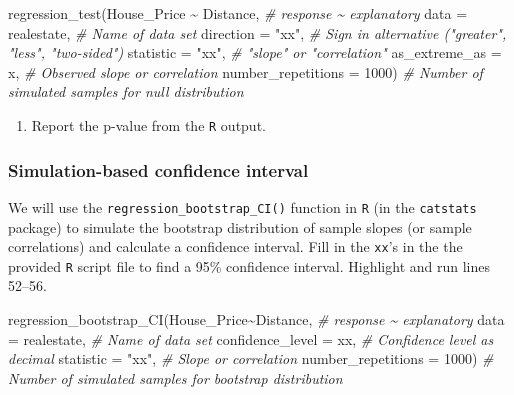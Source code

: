 \documentclass[
]{report}
\newenvironment{Shaded}{\begin{snugshade}}{\end{snugshade}}
\newcommand{\AttributeTok}[1]{\textcolor[rgb]{0.77,0.63,0.00}{#1}}
\newcommand{\CommentTok}[1]{\textcolor[rgb]{0.56,0.35,0.01}{\textit{#1}}}
\newcommand{\DecValTok}[1]{\textcolor[rgb]{0.00,0.00,0.81}{#1}}
\newcommand{\FunctionTok}[1]{\textcolor[rgb]{0.00,0.00,0.00}{#1}}
\newcommand{\NormalTok}[1]{#1}
\newcommand{\SpecialCharTok}[1]{\textcolor[rgb]{0.00,0.00,0.00}{#1}}
\newcommand{\StringTok}[1]{\textcolor[rgb]{0.31,0.60,0.02}{#1}}
\providecommand{\tightlist}{%
  \setlength{\itemsep}{0pt}\setlength{\parskip}{0pt}}
\begin{document}
\begin{Shaded}
\begin{Highlighting}[]
\FunctionTok{regression\_test}\NormalTok{(House\_Price }\SpecialCharTok{\textasciitilde{}}\NormalTok{ Distance, }\CommentTok{\# response \textasciitilde{} explanatory}
               \AttributeTok{data =}\NormalTok{ realestate, }\CommentTok{\# Name of data set}
               \AttributeTok{direction =} \StringTok{"xx"}\NormalTok{, }\CommentTok{\# Sign in alternative ("greater", "less", "two{-}sided")}
               \AttributeTok{statistic =} \StringTok{"xx"}\NormalTok{, }\CommentTok{\# "slope" or "correlation"}
               \AttributeTok{as\_extreme\_as =}\NormalTok{ x, }\CommentTok{\# Observed slope or correlation}
               \AttributeTok{number\_repetitions =} \DecValTok{1000}\NormalTok{) }\CommentTok{\# Number of simulated samples for null distribution}
       
\end{Highlighting}
\end{Shaded}

\begin{enumerate}
\def\labelenumi{\arabic{enumi}.}
\setcounter{enumi}{12}
\tightlist
\item
  Report the p-value from the \texttt{R} output.
  \vspace{0.5in}
\end{enumerate}

\hypertarget{simulation-based-confidence-interval}{%
\subsubsection*{Simulation-based confidence interval}\label{simulation-based-confidence-interval}}

We will use the \texttt{regression\_bootstrap\_CI()} function in \texttt{R} (in the \texttt{catstats} package) to simulate the bootstrap distribution of sample slopes (or sample correlations) and calculate a confidence interval. Fill in the \texttt{xx}'s in the the provided \texttt{R} script file to find a 95\% confidence interval. Highlight and run lines 52--56.

\begin{Shaded}
\begin{Highlighting}[]
\FunctionTok{regression\_bootstrap\_CI}\NormalTok{(House\_Price}\SpecialCharTok{\textasciitilde{}}\NormalTok{Distance, }\CommentTok{\# response \textasciitilde{} explanatory}
   \AttributeTok{data =}\NormalTok{ realestate, }\CommentTok{\# Name of data set}
   \AttributeTok{confidence\_level =}\NormalTok{ xx, }\CommentTok{\# Confidence level as decimal}
   \AttributeTok{statistic =} \StringTok{"xx"}\NormalTok{, }\CommentTok{\# Slope or correlation}
   \AttributeTok{number\_repetitions =} \DecValTok{1000}\NormalTok{) }\CommentTok{\# Number of simulated samples for bootstrap distribution}
\end{Highlighting}
\end{Shaded}
\end{document}
